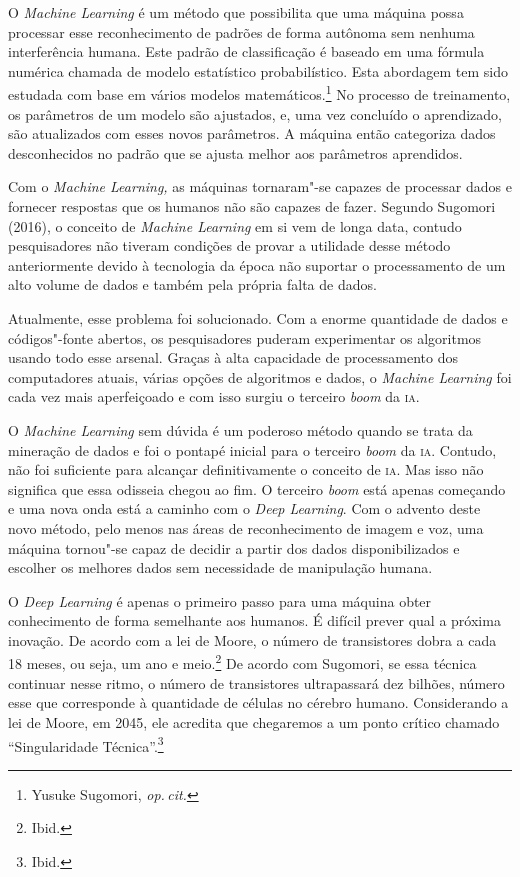 O \emph{Machine Learning} é um método que possibilita que uma máquina
possa processar esse reconhecimento de padrões de forma autônoma sem
nenhuma interferência humana. Este padrão de classificação é baseado em
uma fórmula numérica chamada de modelo estatístico probabilístico. Esta
abordagem tem sido estudada com base em vários modelos matemáticos.\footnote{Yusuke Sugomori, \textit{op.\,cit.}} 
No processo de treinamento, os parâmetros de um modelo
são ajustados, e, uma vez concluído o aprendizado, são atualizados com
esses novos parâmetros. A máquina então categoriza dados desconhecidos
no padrão que se ajusta melhor aos parâmetros aprendidos.

Com o \emph{Machine Learning,} as máquinas tornaram"-se capazes de
processar dados e fornecer respostas que os humanos não são capazes de
fazer. Segundo Sugomori (2016), o conceito de \emph{Machine Learning} em
si vem de longa data, contudo pesquisadores não tiveram condições de
provar a utilidade desse método anteriormente devido à tecnologia da
época não suportar o processamento de um alto volume de dados e também
pela própria falta de dados.

Atualmente, esse problema foi solucionado. Com a enorme quantidade de
dados e códigos"-fonte abertos, os pesquisadores puderam experimentar os
algoritmos usando todo esse arsenal. Graças à alta capacidade de
processamento dos computadores atuais, várias opções de algoritmos e
dados, o \emph{Machine Learning} foi cada vez mais aperfeiçoado e com
isso surgiu o terceiro \emph{boom} da \textsc{ia}.

O \emph{Machine Learning} sem dúvida é um poderoso método quando se
trata da mineração de dados e foi o pontapé inicial para o terceiro
\emph{boom} da \textsc{ia}. Contudo, não foi suficiente para alcançar
definitivamente o conceito de \textsc{ia}. Mas isso não significa que essa
odisseia chegou ao fim. O terceiro \emph{boom} está apenas começando e uma nova
onda está a caminho com o \emph{Deep Learning}. Com o advento deste novo
método, pelo menos nas áreas de reconhecimento de imagem e voz, uma
máquina tornou"-se capaz de decidir a partir dos dados disponibilizados e
escolher os melhores dados sem necessidade de manipulação humana.

O \emph{Deep Learning} é apenas o primeiro passo para uma máquina obter
conhecimento de forma semelhante aos humanos. É difícil prever qual a
próxima inovação. De acordo com a lei de Moore, o número de transistores
dobra a cada 18 meses, ou seja, um ano e meio.\footnote{Ibid.} De
acordo com Sugomori, se essa técnica continuar nesse ritmo, o número de
transistores ultrapassará dez bilhões, número esse que corresponde à
quantidade de células no cérebro humano. Considerando a lei de Moore, em
2045, ele acredita que chegaremos a um ponto crítico chamado
``Singularidade Técnica''.\footnote{Ibid.}

